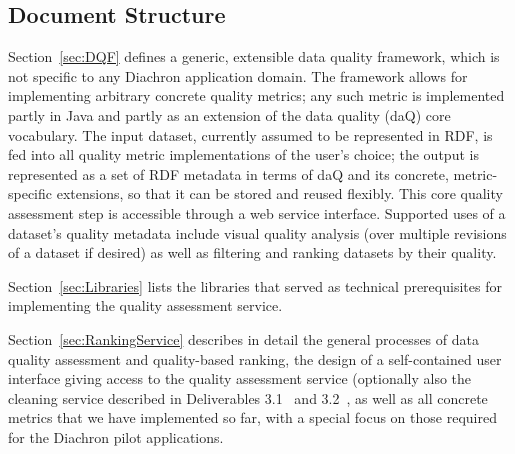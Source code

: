 
\subsection{Document Structure}
\label{sec:DocumentStructure} 

Section~\ref{sec:DQF} defines a generic, extensible data quality framework, which is not specific to any Diachron application domain.  The framework allows for implementing arbitrary concrete quality metrics; any such metric is implemented partly in Java and partly as an extension of the data quality (daQ) core vocabulary.  The input dataset, currently assumed to be represented in RDF, is fed into all quality metric implementations of the user's choice; the output is represented as a set of RDF metadata in terms of daQ and its concrete, metric-specific extensions, so that it can be stored and reused flexibly.  This core quality assessment step is accessible through a web service interface.  Supported uses of a dataset's quality metadata include visual quality analysis (over multiple revisions of a dataset if desired) as well as filtering and ranking datasets by their quality.  

Section~\ref{sec:Libraries} lists the libraries that served as technical prerequisites for implementing the quality assessment service.

Section~\ref{sec:RankingService} describes in detail the general processes of data quality assessment and quality-based ranking, the design of a self-contained user interface giving access to the quality assessment service (optionally also the cleaning service described in Deliverables 3.1~\cite{diachron-d3.1} and 3.2~\cite{diachron-d3.2}, as well as all concrete metrics that we have implemented so far, with a special focus on those required for the Diachron pilot applications.


